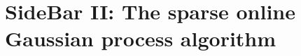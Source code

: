 \documentclass[letterpaper,12pt,peerreviewca,draftcls]{IEEEtran}
\begin{document}




\section{SideBar II: The sparse online Gaussian process algorithm}
\end{document}
